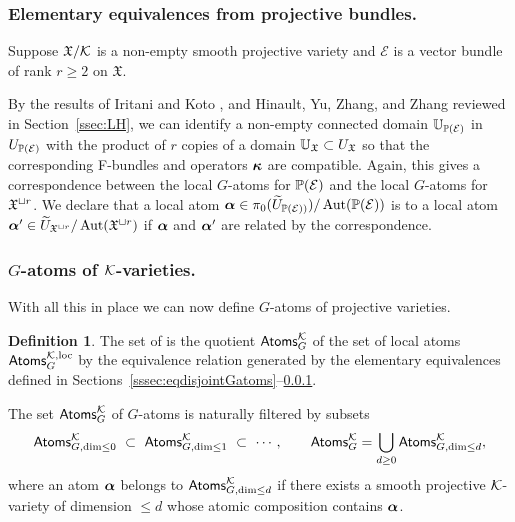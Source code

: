 \documentclass[twoside,leqno]{article}
\numberwithin{equation}{section}
\theoremstyle{plain}
\theoremstyle{definition}
\newtheorem{definition}[equation]{Definition}
\begin{document}
\subsubsection{Elementary equivalences from  projective bundles.} 
\label{sssec:eqprojbunGatoms}
Suppose $\mathfrak{X}/\mathcal K$ is a non-empty  smooth projective variety 
and $\mathcal{E}$ is a vector bundle of rank $r\ge 2$ on $\mathfrak{X}$. 

By the results of Iritani and Koto \cite{Iritani_Koto}, and 
Hinault, Yu, Zhang, and Zhang \cite[Section~5]{HYZZ_Decomposition} reviewed in Section~\ref{ssec:LH}, 
we can identify   a non-empty connected domain $\mathbb{U}_{\mathbb P(\mathcal E)}$ in $U_{\mathbb P(\mathcal E)}$ with the product of $r$ copies of a domain $\mathbb{U}_{\mathfrak X} \subset U_{\mathfrak X}$ so that the corresponding F-bundles and operators $\boldsymbol{\kappa}$ are compatible. Again, this gives a correspondence between the local $G$-atoms for $\mathbb P(\mathcal E)$ and the local $G$-atoms for 
$\mathfrak X^{\sqcup r}$. We declare that a local atom $\boldsymbol{\alpha} \in \pi_{0}(\widetilde{U}_{\mathbb P(\mathcal{E}))})/\operatorname{Aut}(\mathbb P(\mathcal{\mathcal{E}}))$
is  to a local atom $\boldsymbol{\alpha}' \in \widetilde U_{\mathfrak{X}^{\sqcup r}}/\operatorname{Aut}(\mathfrak X^{\sqcup r})$ if $\boldsymbol{\alpha}$ and $\boldsymbol{\alpha}'$ are related by the correspondence.



\subsubsection{\texorpdfstring{$G$}{G}-atoms of \texorpdfstring{$\mathcal K$}{K}-varieties.} \label{sssec:Gatomskay}
With all this in place we can now define $G$-atoms of projective varieties.


\begin{definition} \label{def:G.atoms}
The set of  is the quotient $\mathsf{Atoms}_{G}^{\mathcal K}$ of the set of local atoms  $\mathsf{Atoms}_{G}^{\mathcal K,\operatorname{loc}}$ by the equivalence relation generated by the elementary equivalences defined in Sections~\ref{sssec:eqdisjointGatoms}--\ref{sssec:eqprojbunGatoms}.
\end{definition}


The set $\mathsf{Atoms}_{G}^{\mathcal K}$ of $G$-atoms is naturally filtered by subsets
\[\mathsf{Atoms}_{G,\dim \leq 0}^{\kay} 
\ \subset \ \mathsf{Atoms}_{G,\dim \leq 1}^{\kay} \ \subset \ \cdots,  \qquad 
\mathsf{Atoms}_{G}^{\kay}=\bigcup_{d\geq 0}\mathsf{Atoms}_{G,\dim \leq d}^{\kay},
\]
where an atom $\boldsymbol{\alpha}$ belongs to  $\mathsf{Atoms}_{G,\dim \leq d}^{\mathcal K}$ if there exists 
a smooth projective $\mathcal K$-variety of dimension $\leq d$ whose atomic composition contains $\boldsymbol{\alpha}$. 
\end{document}
